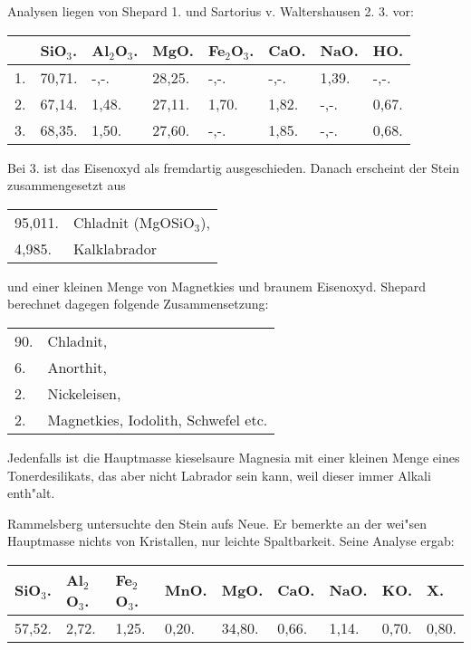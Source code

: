 \documentclass[a4paper, 11pt, oneside]{article}
\begin{document}
Analysen liegen von Shepard 1. und Sartorius v. Waltershausen 2. 3. vor:
\begin{table}[!ht]
    \centering\swabfamily\Large
    \begin{tabular}{l l l l l l l l}
         & SiO$_{3}$. & Al$_{2}$O$_{3}$. & MgO. & Fe$_{2}$O$_{3}$. & CaO. & NaO. & HO. \\ \hline
        1. & 70,71. & -,-. & 28,25. & -,-. & -,-. & 1,39. & -,-. \\
        2. & 67,14. & 1,48. & 27,11. & 1,70. & 1,82. & -,-. & 0,67. \\
        3. & 68,35. & 1,50. & 27,60. & -,-. & 1,85. & -,-. & 0,68. \\
    \end{tabular}
\end{table}

Bei 3. ist das Eisenoxyd als fremdartig ausgeschieden. Danach erscheint der Stein zusammengesetzt aus
\begin{table}[!ht]
    \centering\swabfamily\Large
    \begin{tabular}{l l}
        95,011. & Chladnit (MgOSiO$_{3}$), \\
        4,985. & Kalklabrador \\
    \end{tabular}
\end{table}
 
und einer kleinen Menge von Magnetkies und braunem Eisenoxyd. Shepard berechnet dagegen folgende Zusammensetzung:
\begin{table}[!ht]
    \centering\swabfamily\Large
    \begin{tabular}{l l}
        90. & Chladnit, \\
        6. & Anorthit, \\
        2. & Nickeleisen, \\
        2. & Magnetkies, Iodolith, Schwefel etc. \\
    \end{tabular}
\end{table}

Jedenfalls ist die Hauptmasse kieselsaure Magnesia mit einer kleinen Menge eines Tonerdesilikats, das aber nicht Labrador sein kann, weil dieser immer Alkali enth"alt.

Rammelsberg untersuchte den Stein aufs Neue. Er bemerkte an der wei"sen Hauptmasse nichts von Kristallen, nur leichte Spaltbarkeit. Seine Analyse ergab:
\begin{table}[!ht]
    \centering\swabfamily\Large
    \begin{tabular}{l l l l l l l l l}
        SiO$_{3}$. & Al$_{2}$O$_{3}$. & Fe$_{2}$O$_{3}$. & MnO. & MgO. & CaO. & NaO. & KO. & X. \\ \hline
        57,52. & 2,72. & 1,25. & 0,20. & 34,80. & 0,66. & 1,14. & 0,70. & 0,80. \\
    \end{tabular}
\end{table}
\end{document}
